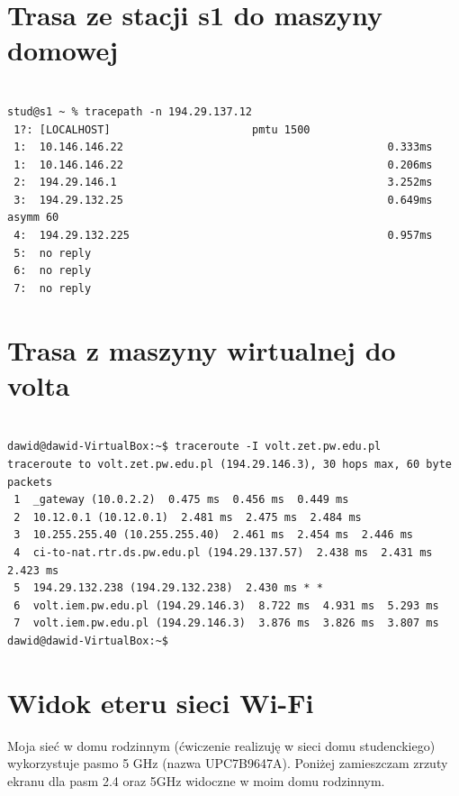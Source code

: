 \documentclass[a4paper,11pt]{article}
\begin{document}
\section{Trasa ze stacji s1 do maszyny domowej}

\begin{verbatim}

stud@s1 ~ % tracepath -n 194.29.137.12
 1?: [LOCALHOST]                      pmtu 1500
 1:  10.146.146.22                                         0.333ms
 1:  10.146.146.22                                         0.206ms
 2:  194.29.146.1                                          3.252ms
 3:  194.29.132.25                                         0.649ms asymm 60
 4:  194.29.132.225                                        0.957ms
 5:  no reply
 6:  no reply
 7:  no reply

\end{verbatim}

\section{Trasa z maszyny wirtualnej do volta}

\begin{verbatim}

dawid@dawid-VirtualBox:~$ traceroute -I volt.zet.pw.edu.pl
traceroute to volt.zet.pw.edu.pl (194.29.146.3), 30 hops max, 60 byte packets
 1  _gateway (10.0.2.2)  0.475 ms  0.456 ms  0.449 ms
 2  10.12.0.1 (10.12.0.1)  2.481 ms  2.475 ms  2.484 ms
 3  10.255.255.40 (10.255.255.40)  2.461 ms  2.454 ms  2.446 ms
 4  ci-to-nat.rtr.ds.pw.edu.pl (194.29.137.57)  2.438 ms  2.431 ms  2.423 ms
 5  194.29.132.238 (194.29.132.238)  2.430 ms * *
 6  volt.iem.pw.edu.pl (194.29.146.3)  8.722 ms  4.931 ms  5.293 ms
 7  volt.iem.pw.edu.pl (194.29.146.3)  3.876 ms  3.826 ms  3.807 ms
dawid@dawid-VirtualBox:~$

\end{verbatim}

\section{Widok eteru sieci Wi-Fi}

Moja sieć w domu rodzinnym (ćwiczenie realizuję w sieci domu studenckiego) wykorzystuje pasmo 5 GHz (nazwa UPC7B9647A). Poniżej zamieszczam zrzuty ekranu dla pasm 2.4 oraz 5GHz widoczne w moim domu rodzinnym.
\end{document}
